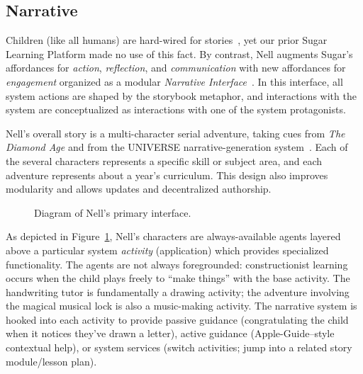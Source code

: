 \documentclass[preprint]{sig-alternate}
\begin{document}

\subsection{Narrative}

Children (like all humans) are hard-wired for
stories~\cite{boyd:stories}, yet our prior Sugar Learning Platform
made no use of this fact. By contrast, Nell augments Sugar's
affordances for \textit{action}, \textit{reflection}, and
\textit{communication} with new affordances for \textit{engagement} organized
as a modular \textit{Narrative Interface}~\cite{bizzocchi:narrative,don:narrative}.
In this interface, all system actions are shaped by the storybook metaphor, and
interactions with the system are conceptualized as interactions with one of the
system protagonists.

Nell's overall story is a multi-character serial adventure, taking
cues from \textit{The Diamond Age} and
from the UNIVERSE narrative-generation system~\cite{lebowitz:universe85}.
Each of the several characters represents a specific skill or subject
area, and each adventure represents about a year's curriculum.  This
design also improves modularity and allows updates and decentralized
authorship.

\begin{figure}
\centering
{} %
\caption{Diagram of Nell's primary interface.}\label{fig:nell}
\end{figure}

As depicted in Figure~\ref{fig:nell}, Nell's characters are
always-available agents layered above a particular system \textit{activity}
(application) which provides specialized functionality.  The agents
are not always foregrounded: constructionist learning occurs when the
child plays freely to ``make things'' with the base activity.
The handwriting tutor is fundamentally a drawing activity; the
adventure involving the magical musical lock is also a music-making activity.
The narrative system is
hooked into each activity to provide passive guidance
(congratulating the child when it notices they've drawn a letter),
active guidance (Apple-Guide--style~\cite{powers:appleguide}
contextual help), or system services (switch activities; jump into a
related story module/lesson plan).
\end{document}
